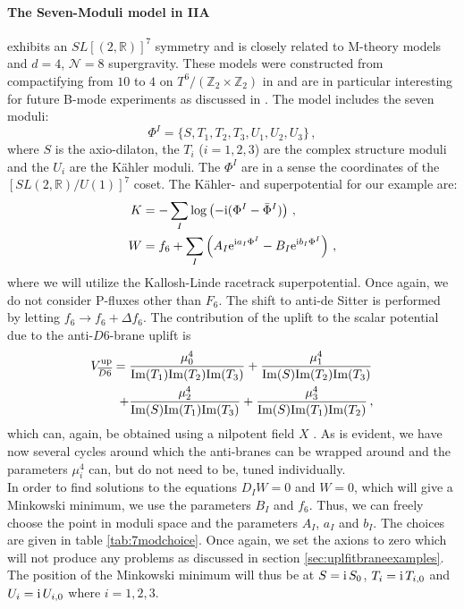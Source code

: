 \documentclass[12pt]{report}
\newcommand{\be}{\begin{equation}}
\newcommand{\ee}{\end{equation}}
\newcommand{\bea}{\begin{equation}\begin{aligned}}
\newcommand{\eea}{\end{aligned}\end{equation}}
\def\rmi{{\rm i}}
\def\rme{{\rm e}}
\def\rmim{{\rm Im}}
\begin{document}
\paragraph{The Seven-Moduli model in IIA} exhibits an $SL[(2,\mathbb{R})]^7$ symmetry and is closely related to M-theory models and $d=4$, $\mathcal{N}=8$ supergravity. These models were constructed from compactifying from $10$ to $4$ on $T^6/(\mathbb{Z}_2 \times \mathbb{Z}_2)$ in \cite{Derendinger:2004jn,Villadoro:2005cu} and are in particular interesting for future B-mode experiments as discussed in \cite{Ferrara:2016fwe,Kallosh:2017ced}. The model includes the seven moduli:
\be 
\Phi^I = \{S,T_1,T_2,T_3,U_1,U_2,U_3\}\,,
\ee
where $S$ is the axio-dilaton, the $T_i$ ($i=1,2,3$) are the complex structure moduli and the $U_i$ are the Kähler moduli. The $\Phi^I$ are in a sense the coordinates of the $[SL(2,\mathbb{R})/U(1)]^7$ coset. The Kähler- and superpotential for our example are:
\bea 
\label{eq:massIIA7modpot}
K &= - \sum_I \log \left(-\rmi (\Phi^I -\bar{\Phi}^I)\right)\,,\\
W &= f_6 + \sum_I \left( A_I \rme^{\rmi a_I \Phi^I} - B_I \rme^{\rmi b_I \Phi^I} \right)\,,
\eea 
where we will utilize the Kallosh-Linde racetrack superpotential. Once again, we do not consider P-fluxes other than $F_6$. The shift to anti-de Sitter is performed by letting $f_6 \to f_6 + \Delta f_6$. The contribution of the uplift to the scalar potential due to the anti-$D6$-brane uplift is
\bea
V_{\overline{D6}}^{\text{up}} =\; & \frac{\mu_0^4}{\rmim(T_1)\rmim(T_2)\rmim(T_3)} + \frac{\mu_1^4}{\rmim(S)\rmim(T_2)\rmim(T_3)} \\+ & \frac{\mu_2^4}{\rmim(S)\rmim(T_1)\rmim(T_3)} + \frac{\mu_3^4}{\rmim(S)\rmim(T_1)\rmim(T_2)}\,,
\eea
which can, again, be obtained using a nilpotent field $X$ \cite{Kallosh:2018nrk,Cribiori:2019bfx}. As is evident, we have now several cycles around which the anti-branes can be wrapped around and the parameters $\mu_i^4$ can, but do not need to be, tuned individually.\\
In order to find solutions to the equations $D_I W =0$ and $W=0$, which will give a Minkowski minimum, we use the parameters $B_I$ and $f_6$. Thus, we can freely choose the point in moduli space and the parameters $A_I$, $a_I$ and $b_I$. The choices are given in table \ref{tab:7modchoice}. Once again, we set the axions to zero which will not produce any problems as discussed in section \ref{sec:uplfitbraneexamples}. The position of the Minkowski minimum will thus be at $S=\rmi \,S_0$, $T_i = \rmi \,T_{i,0}$ and $U_i = \rmi \,U_{i,0}$ where $i=1,2,3$.\\
\end{document}
